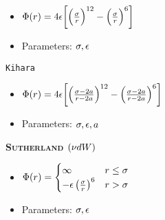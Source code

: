 \begin{mdframed}
\begin{itemize}[label=]
    \item $\pot(\pos) = 4\dielec\bigg[\Big(\frac{\molecrad}{\pos}\Big)^{12}-\Big(\frac{\molecrad}{\pos}\Big)^6\bigg] $
	
    \item Parameters: $\molecrad, \dielec$

	\end{itemize}
  
    \texttt{Kihara}
    
    \begin{itemize}[label={---}]
	
    \item $\pot(\pos) = 4\dielec\bigg[\Big(\frac{\molecrad-2\activity}{\pos-2\activity}\Big)^{12}-\Big(\frac{\molecrad-2\activity}{\pos-2\activity}\Big)^6\bigg] $
    
    \item Parameters: $\molecrad, \dielec, \activity$

	\end{itemize}

    
    {\bfseries\textsc{Sutherland} $(\freq d\work)$}
    
	\begin{itemize}[label=]
	\item $\pot(\pos)=\begin{cases}
                    \infty & \pos \leq \molecrad\\
                    -\dielec\left(\frac{\molecrad}{\pos}\right)^6& \pos > \molecrad
                \end{cases}$
	\item Parameters: $\molecrad, \dielec$   
\end{itemize}
   
\end{mdframed}